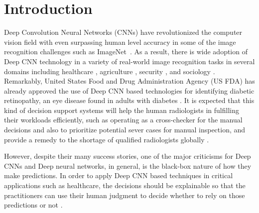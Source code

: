 \section{Introduction}
Deep Convolution Neural Networks (CNNs) \cite{alexnet, vggnet, resnet, inception} have revolutionized the computer vision field with even surpassing human level accuracy in some of the image recognition challenges such as ImageNet~\cite{imagenet}.
As a result, there is wide adoption of Deep CNN technology in a variety of real-world image recognition tasks in several domains including healthcare \cite{kermany2018identifying, islam2017abnormality}, agriculture \cite{mohanty2016using}, security \cite{arbabzadah2016identifying}, and sociology \cite{wang2017deep}.
Remarkably, United States Food and Drug Administration Agency (US FDA) has already approved the use of Deep CNN based technologies for identifying diabetic retinopathy, an eye disease found in adults with diabetes \cite{fdaretinopathy}.
It is expected that this kind of decision support systems will help the human radiologists in fulfilling their workloads efficiently, such as operating as a cross-checker for the manual decisions and also to prioritize potential sever cases for manual inspection, and provide a remedy to the shortage of qualified radiologists globally \cite{radiologistshortage}.

However, despite their many success stories, one of the major criticisms for Deep CNNs and Deep neural networks, in general, is the black-box nature of how they make predictions.
In order to apply Deep CNN based techniques in critical applications such as healthcare, the decisions should be explainable so that the practitioners can use their human judgment to decide whether to rely on those predictions or not \cite{jung2017deep}.


